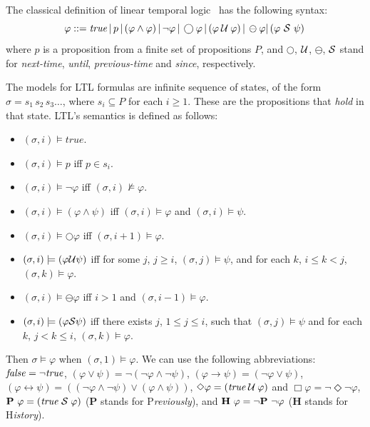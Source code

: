 The classical definition of linear temporal logic~\cite{MP} has the following syntax:
\[ \varphi ::= \mathit{true} \, | \,  p \, | \, ( \varphi \wedge \varphi ) \, |  \, \neg  \varphi \, |   \, \bigcirc \varphi \, |  
\, ( \varphi  \mathbin{\mathcal{U}}  \varphi ) \,|  \, \ominus \varphi |
   \, ( \varphi \ {\cal S} \ \psi ) \,  \]
where $p$ is a proposition from a finite set of propositions $P$, and $\bigcirc$, $\mathbin{\mathcal{U}}$, $\ominus$, ${\cal S}$ stand for {\em next-time}, 
{\em until}, {\em previous-time} and {\em since}, respectively.


The models for LTL formulas 
are infinite sequence of states, of the form
$\sigma =  s_{1}\, s_{2}\, s_3 \ldots$,
where $s_i \subseteq P$ for each $i\geq 1$. These are the propositions that {\em hold} in that state.
LTL's semantics is defined as follows:
\begin{itemize}
\item $( \sigma, {i}) \models \mathit{true}$.
\item $(\sigma, {i}) \models p$ iff $p \in s_{i}$.
\item $(\sigma, {i}) \models \neg\varphi$ iff  $(\sigma, {i}) \not\models \varphi$.
\item $(\sigma, {i}) \models ( \varphi \land \psi)$ iff $(\sigma, {i}) \models \varphi$ and $(\sigma, {i} ) \models \psi$.
\item $(\sigma, {i}) \models \bigcirc \varphi$ iff $(\sigma, {i+1}) \models \varphi$.
\item $(\sigma, {i}) \models ( \varphi  \cal{U}  \psi )$ iff for some $j$,
$j\geq i$, $(\sigma, {j}) \models \psi$,
and for each $k$, $i \leq k < j$, $(\sigma, {k}) \models \varphi$.
\item $(\sigma , i) \models \ominus \varphi$ iff $i > 1$ and $(\sigma, i-1) \models \varphi$.
\item $(\sigma , i) \models (\varphi {\cal S} \psi)$ iff there exists $j$, $1 \leq j \leq i$, such that
$(\sigma , j)  \models \psi$ and for each
$k$, $j < k \leq i$, $(\sigma , k ) \models \varphi$.
\end{itemize}
Then $\sigma \models \varphi$ when $( \sigma ,1 ) \models \varphi$.
We can use the following abbreviations:
$\mathit{false} = \neg \mathit{true}$, 
$(\varphi \vee \psi) = \neg ( \neg \varphi \wedge \neg \psi )$, 
$(\varphi \rightarrow \psi) = ( \neg \varphi \vee \psi)$,
$(\varphi \leftrightarrow \psi) = ((\neg \varphi \wedge \neg \psi) \vee (\varphi \wedge \psi ))$,
$\Diamond \varphi = (\mathit{true} \mathbin{\mathcal{U}} \varphi)$ and $\Box \varphi = \neg \Diamond \neg \varphi$,
${\bf P}\  \varphi = (\mathit{true} \; {\cal S} \; \varphi)$ ({\bf P} stands for P{\em reviously}), and 
${\bf H}\  \varphi = \neg {\bf P}\ \neg \varphi$ ({\bf H} stands for 
H{\em istory}).



